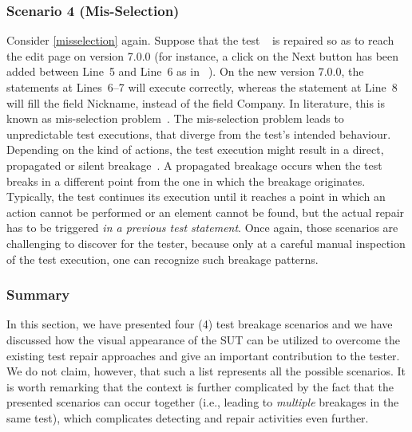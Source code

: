 \subsubsection{Scenario 4 (Mis-Selection)} 
Consider \autoref{misselection} again. 
Suppose that the test~\textcircled{} is repaired so as to reach the edit page on version 7.0.0 (for instance, a click on the Next button has been added between Line~5 and Line~6 as in~\textcircled{}). On the new version 7.0.0, the statements at Lines~6--7 will execute correctly, whereas the statement at Line~8 will fill the field Nickname, instead of the field Company. In literature, this is known as mis-selection problem~\cite{Choudhary:2011:WWA:2002931.2002935}. %
The mis-selection problem leads to unpredictable test executions, that diverge from the test's intended behaviour. Depending on the kind of actions, the test execution might result in a direct, propagated or silent breakage~\cite{Hammoudi-2016-ICST}. A propagated breakage occurs when the test breaks in a different point from the one in which the breakage originates. Typically, the test continues its execution until it reaches a point in which an action cannot be performed or an element cannot be found, but the actual repair has to be triggered \textit{in a previous test statement}. Once again, those scenarios are challenging to discover for the tester, because only at a careful manual inspection of the test execution, one can recognize such breakage patterns.

\subsubsection{Summary}
In this section, we have presented four (4) test breakage scenarios and we have discussed how the visual appearance of the SUT can be utilized to overcome the existing test repair approaches and give an important contribution to the tester. We do not claim, however, that such a list represents all the possible scenarios. It is worth remarking that the context is further complicated by the fact that the presented scenarios can occur together (i.e., leading to \textit{multiple} breakages in the same test), which complicates detecting and repair activities even further.


